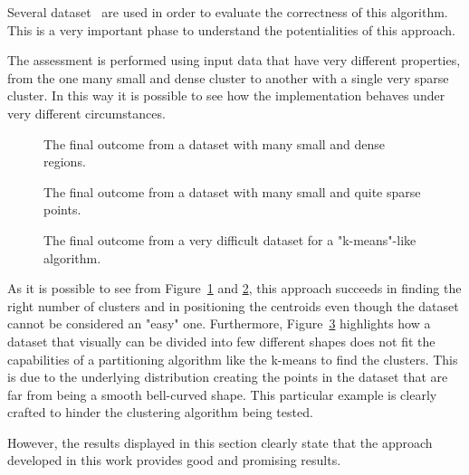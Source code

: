 \label{experiments}
Several dataset~\cite{ClusteringDatasets} are used in order to evaluate the correctness 
of this algorithm. This is a very important phase to understand the potentialities of 
this approach.

The assessment is performed using input data that have very different properties,
from the one many small and dense cluster to another with a single very sparse cluster.
In this way it is possible to see how the implementation behaves under very 
different circumstances.

\begin{figure}[t]
  \caption{The final outcome from a dataset with many small and dense regions.}
  \label{dataset1}
\end{figure}

\begin{figure}[t]
  \caption{The final outcome from a dataset with many small and quite sparse points.}
  \label{dataset2}
\end{figure}

\begin{figure}[t]
  \caption{The final outcome from a very difficult dataset for a "k-means"-like algorithm.}
  \label{dataset3}
\end{figure}

As it is possible to see from Figure~\ref{dataset1} and \ref{dataset2}, this approach
succeeds in finding the right number of clusters and in positioning the centroids even
though the dataset cannot be considered an "easy" one. 
Furthermore, Figure~\ref{dataset3} highlights how a dataset that visually can be 
divided into few different shapes does not fit the capabilities of a partitioning
algorithm like the k-means to find the clusters. This is due to the underlying distribution
creating the points in the dataset that are far from being a smooth bell-curved shape.
This particular example is clearly crafted to hinder the clustering algorithm being tested.

However, the results displayed in this section clearly state that the approach developed
in this work provides good and promising results.
